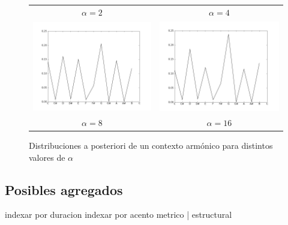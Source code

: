 \begin{figure}[htp]
\begin{center}
\begin{tabular}{cc}
        $\alpha=2$ & $\alpha=4$ \\
        \includegraphics[width=7.5cm]{images/posteriors/posterior-profile-8.png} &
        \includegraphics[width=7.5cm]{images/posteriors/posterior-profile-16.png} \\
        $\alpha=8$ & $\alpha=16$ \\

        \end{tabular}
        \label{fig:mat1}
        \caption{Distribuciones a posteriori de un contexto arm\'onico para distintos valores de $\alpha$}
    \end{center}      
\end{figure}

\subsection{Posibles agregados}
indexar por duracion
indexar por acento metrico | estructural
